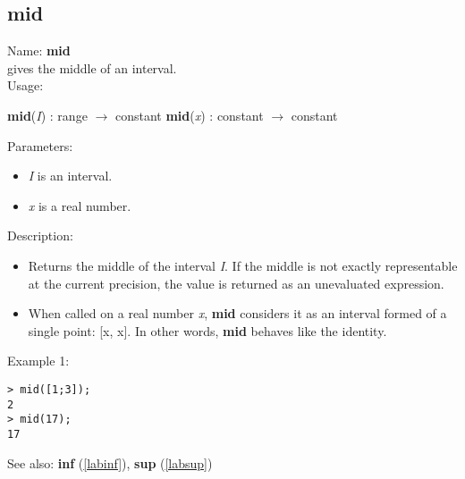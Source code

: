 \subsection{mid}
\label{labmid}
\noindent Name: \textbf{mid}\\
gives the middle of an interval.\\
\noindent Usage: 
\begin{center}
\textbf{mid}(\emph{I}) : \textsf{range} $\rightarrow$ \textsf{constant}
\textbf{mid}(\emph{x}) : \textsf{constant} $\rightarrow$ \textsf{constant}
\end{center}
Parameters: 
\begin{itemize}
\item \emph{I} is an interval.
\item \emph{x} is a real number.
\end{itemize}
\noindent Description: \begin{itemize}

\item Returns the middle of the interval \emph{I}. If the middle is not exactly
   representable at the current precision, the value is returned as an
   unevaluated expression.

\item When called on a real number \emph{x}, \textbf{mid} considers it as an interval formed
   of a single point: [x, x]. In other words, \textbf{mid} behaves like the identity.
\end{itemize}
\noindent Example 1: 
\begin{center}\begin{minipage}{15cm}\begin{Verbatim}[frame=single]
> mid([1;3]);
2
> mid(17);
17
\end{Verbatim}
\end{minipage}\end{center}
See also: \textbf{inf} (\ref{labinf}), \textbf{sup} (\ref{labsup})
